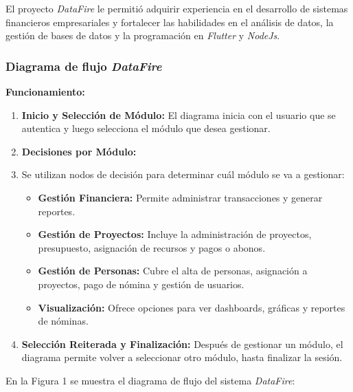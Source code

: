 \documentclass[protocolo.tex]{subfiles}
\begin{document}
El proyecto \textit{DataFire} le permitió adquirir experiencia en el desarrollo de sistemas financieros empresariales y fortalecer las habilidades en el análisis de datos, la gestión de bases de datos y la programación en \textit{Flutter} y \textit{NodeJs}.

\subsubsection{Diagrama de flujo \textit{DataFire} }
\textbf{Funcionamiento:}
\begin{enumerate}
    \item \textbf{Inicio y Selección de Módulo:}  
    El diagrama inicia con el usuario que se autentica y luego selecciona el módulo que desea gestionar.
    \item \textbf{Decisiones por Módulo:} 
    \item Se utilizan nodos de decisión para determinar cuál módulo se va a gestionar:
        \begin{itemize}
            \item \textbf{Gestión Financiera:}  Permite administrar transacciones y generar reportes.
            \item \textbf{Gestión de Proyectos:}  Incluye la administración de proyectos, presupuesto, asignación de recursos y pagos o abonos.
            \item \textbf{Gestión de Personas:}  Cubre el alta de personas, asignación a proyectos, pago de nómina y gestión de usuarios.
            \item \textbf{Visualización:} Ofrece opciones para ver dashboards, gráficas y reportes de nóminas.
        \end{itemize}
    \item \textbf{Selección Reiterada y Finalización:} 
    Después de gestionar un módulo, el diagrama permite volver a seleccionar otro módulo, hasta finalizar la sesión.
\end{enumerate}

En la Figura 1 se muestra el diagrama de flujo del sistema \textit{DataFire}:\vspace{2mm}
\end{document}
